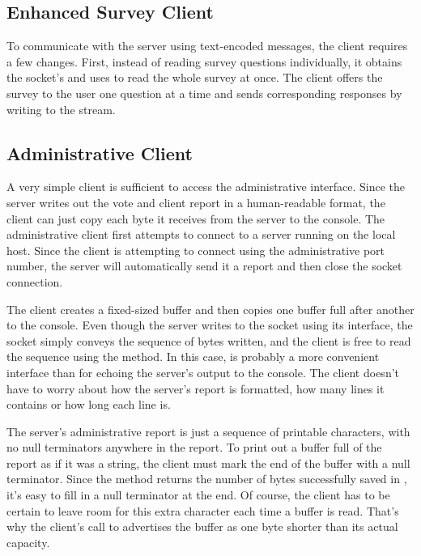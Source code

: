 \subsection{Enhanced Survey Client}

To communicate with the server using text-encoded messages, the client
requires a few changes.  First, instead of reading survey questions
individually, it obtains the socket's  and uses
 to read the whole survey at once.  The client
offers the survey to the user one question at a time and sends
corresponding responses by writing to the stream.


\subsection{Administrative Client}

A very simple client is sufficient to access the administrative
interface.  Since the server writes out the vote and client report in
a human-readable format, the client can just copy each byte it
receives from the server to the console.  The administrative client
first attempts to connect to a server running on the local host.
Since the client is attempting to connect using the administrative
port number, the server will automatically send it a report and then close
the socket connection.

The client creates a fixed-sized buffer and then copies one buffer
full after another to the console.  Even though the server writes to
the socket using its  interface, the socket simply
conveys the sequence of bytes written, and the client is free to read
the sequence using the  method.  In this case,
 is probably a more convenient interface than
 for echoing the server's output to the console.  The
client doesn't have to worry about how the server's report is
formatted, how many lines it contains or how long each line is.

The server's administrative report is just a sequence of printable
characters, with no null terminators anywhere in the report.  To print
out a buffer full of the report as if it was a string, the client must
mark the end of the buffer with a null terminator.  Since the
 method returns the number of bytes successfully
saved in , it's easy to fill in a null terminator at the
end.  Of course, the client has to be certain to leave room for this
extra character each time a buffer is read.  That's why the client's
call to  advertises the buffer as one byte shorter than
its actual capacity.

